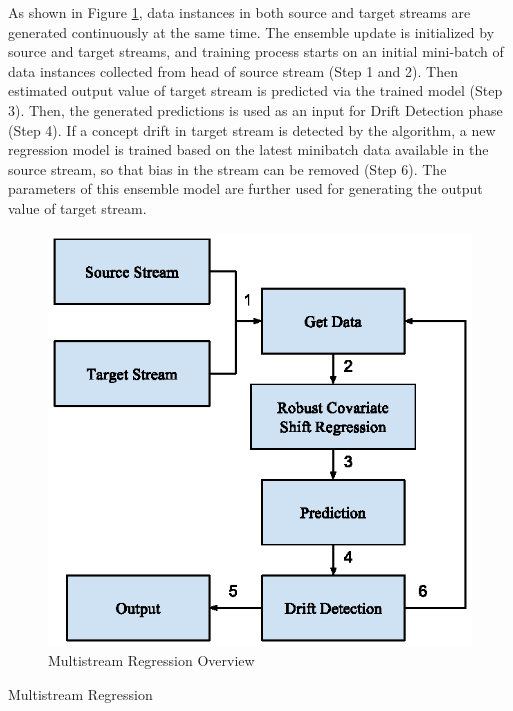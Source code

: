 \documentclass[conference,compsoc]{IEEEtran}
\begin{document}
As shown in Figure \ref{fig:flowchart}, data instances in both 
source and target streams are generated continuously at the same time. The ensemble 
update is initialized by source and target streams, and training process starts on an initial mini-batch of data instances collected from head of source stream (Step 1 and 2). Then estimated output value of target stream is predicted via the trained model (Step 3).
Then, the generated predictions is used as an input for Drift Detection phase (Step 4). If a concept drift in target stream is detected by the algorithm, a new regression model is trained based on the latest minibatch data available in the source stream, so that bias in the stream can be removed (Step 6). The parameters of this ensemble model are further used for generating the output value of target stream.
\begin{figure}
\centering
\includegraphics{fig_flowchart.eps}
\caption{Multistream Regression Overview}
\label{fig:flowchart}
\end{figure}

\makeatletter
\def\BState{\State\hskip-\ALG@thistlm}
\makeatother

\begin{algorithm}
\caption{Multistream Regression}\label{pse:MSR}
\end{algorithm}
\end{document}
